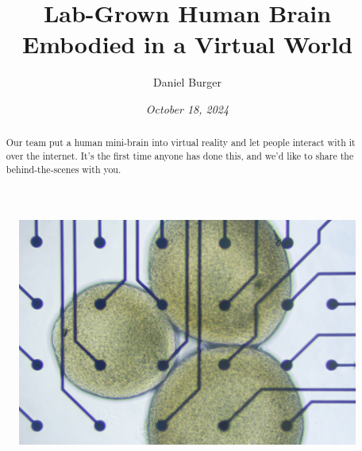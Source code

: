 \documentclass[10pt]{article}
\begin{document}
\setlength{\footskip}{65pt}


\title{\textbf{Lab-Grown Human Brain \\ Embodied in a Virtual World}}
\author[1]{Daniel Burger}
\date{\textit{October 18, 2024}}
\maketitle
\thispagestyle{empty}

\begin{sloppypar}

  \begin{figure}[ht]
    \centering
    \includegraphics[width=\textwidth]{figures/cover.jpg}
    \label{fig:cover}
  \end{figure}


  \begin{abstract}
    Our team put a human mini-brain into virtual reality and let people interact with it over the internet. It's the first time anyone has done this, and we'd like to share the behind-the-scenes with you.
  \end{abstract}

  \pagebreak
  \tableofcontents
  \pagebreak
  \listoffigures
  \pagebreak
  \listoftables
  \pagebreak
  \lstlistoflistings
  \pagebreak


\end{sloppypar}
\end{document}
